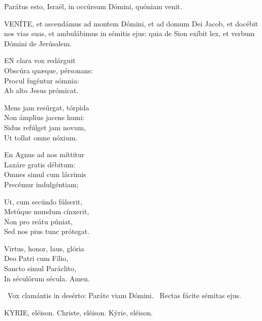 
 Parátus esto, Israël, in occúrsum Dómini, quóniam venit.



\lettrine[lines=2]{V}{ENÍTE}, et ascendámus ad montem Dómini, et ad domum Dei Jacob, et docébit nos vias suas, et ambulábimus in sémitis ejus: quia de Sion exíbit lex, et verbum Dómini de Jerúsalem.


\lettrine[lines=2]{E}{N} clara vox redárguit\\
Obscúra quæque, pérsonans:\\
Procul fugéntur sómnia:\\
Ab alto Jesus prómicat.

Mens jam resúrgat, tórpida\\
Non ámplius jacens humi:\\
Sidus refúlget jam novum,\\
Ut tollat omne nóxium.

En Agnus ad nos míttitur\\
Laxáre gratis débitum:\\
Omnes simul cum lácrimis\\
Precémur indulgéntiam;

Ut, cum secúndo fúlserit,\\
Metúque mundum cínxerit,\\
Non pro reátu púniat,\\
Sed nos pius tunc prótegat.

Virtus, honor, laus, glória\\
Deo Patri cum Fílio,\\
Sancto simul Paráclito,\\
In séculórum sécula. Amen.

\V\ Vox clamántis in desérto: Paráte viam Dómini. \R\ Rectas fácite sémitas ejus.




KYRIE, eléison. Christe, eléison. Kýrie, eléison.

